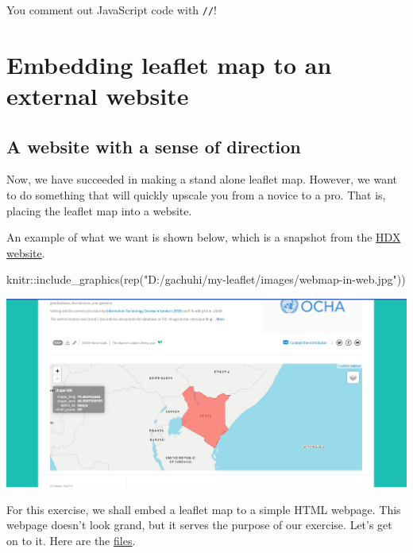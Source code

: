 \documentclass[
]{book}
\newenvironment{Shaded}{\begin{snugshade}}{\end{snugshade}}
\newcommand{\FunctionTok}[1]{\textcolor[rgb]{0.00,0.00,0.00}{#1}}
\newcommand{\NormalTok}[1]{#1}
\newcommand{\SpecialCharTok}[1]{\textcolor[rgb]{0.00,0.00,0.00}{#1}}
\newcommand{\StringTok}[1]{\textcolor[rgb]{0.31,0.60,0.02}{#1}}
\begin{document}
You comment out JavaScript code with \texttt{//}!

\hypertarget{embedding-leaflet-map-to-an-external-website}{%
\chapter{Embedding leaflet map to an external website}\label{embedding-leaflet-map-to-an-external-website}}

\hypertarget{a-website-with-a-sense-of-direction}{%
\section{A website with a sense of direction}\label{a-website-with-a-sense-of-direction}}

Now, we have succeeded in making a stand alone leaflet map. However, we want to do something that will quickly upscale you from a novice to a pro. That is, placing the leaflet map into a website.

An example of what we want is shown below, which is a snapshot from the \href{https://data.humdata.org/dataset/cod-ab-ken}{HDX website}.

\begin{Shaded}
\begin{Highlighting}[]
\NormalTok{knitr}\SpecialCharTok{::}\FunctionTok{include\_graphics}\NormalTok{(}\FunctionTok{rep}\NormalTok{(}\StringTok{"D:/gachuhi/my{-}leaflet/images/webmap{-}in{-}web.jpg"}\NormalTok{))}
\end{Highlighting}
\end{Shaded}

\includegraphics[width=26.07in]{../images/webmap-in-web}

For this exercise, we shall embed a leaflet map to a simple HTML webpage. This webpage doesn't look grand, but it serves the purpose of our exercise. Let's get on to it. Here are the \href{https://github.com/sammigachuhi/my-leaflet-project/tree/main/my-leaflet-code/chapter-4-embed-leaflet-website}{files}.
\end{document}
